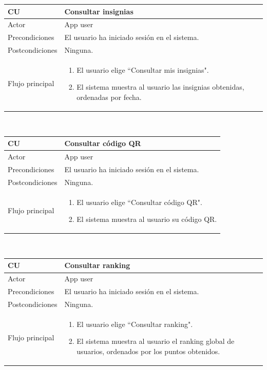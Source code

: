 \documentclass[twoside]{report}
\newcommand\addrow[2]{#1 &#2\\ }
\newcommand\addheading[2]{#1 &#2\\ \hline}
\newcommand\tabularhead{\begin{tabular}{lp{0.7\textwidth}}
\hline
}
\newenvironment{usecase}{\tabularhead}
{\hline\end{tabular}}
\begin{document}
\begin{usecase}
  \addheading{\textbf{CU\arabic{usecase}}}{Consultar insignias} 
  \addrow{Actor}{App user}
  \addrow{Precondiciones}{El usuario ha iniciado sesión en el sistema.}
  \addrow{Postcondiciones}{Ninguna.}
  \addrow{Flujo principal}{
  		\begin{enumerate}
  		\item El usuario elige “Consultar mis insignias".
  		\item El sistema muestra al usuario las insignias obtenidas, ordenadas por fecha.
  		\end{enumerate}
  }
\end{usecase}\\

\begin{usecase}
  \addheading{\textbf{CU\arabic{usecase}}}{Consultar código QR} 
  \addrow{Actor}{App user}
  \addrow{Precondiciones}{El usuario ha iniciado sesión en el sistema.}
  \addrow{Postcondiciones}{Ninguna.}
  \addrow{Flujo principal}{
  		\begin{enumerate}
  		\item El usuario elige “Consultar código QR".
  		\item El sistema muestra al usuario su código QR.
  		\end{enumerate}
  }
\end{usecase}\\

\begin{usecase}
  \addheading{\textbf{CU\arabic{usecase}}}{Consultar ranking} 
  \addrow{Actor}{App user}
  \addrow{Precondiciones}{El usuario ha iniciado sesión en el sistema.}
  \addrow{Postcondiciones}{Ninguna.}
  \addrow{Flujo principal}{
  		\begin{enumerate}
  		\item El usuario elige “Consultar ranking".
  		\item El sistema muestra al usuario el ranking global de usuarios, ordenados por los puntos obtenidos.
  		\end{enumerate}
  }
\end{usecase}\\
\end{document}
